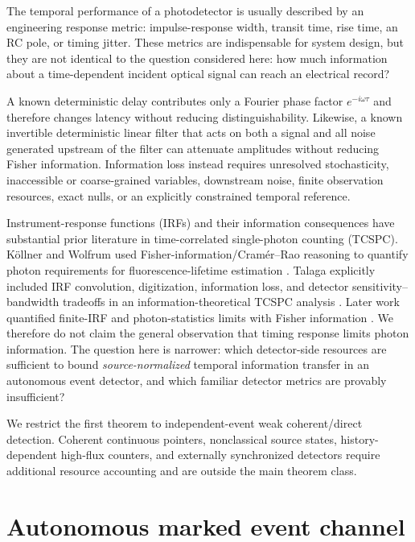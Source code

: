 \documentclass[aps,prapplied,preprint,nofootinbib]{revtex4-2}
\begin{document}
The temporal performance of a photodetector is usually described by an engineering response metric: impulse-response width, transit time, rise time, an RC pole, or timing jitter. These metrics are indispensable for system design, but they are not identical to the question considered here: how much information about a time-dependent incident optical signal can reach an electrical record?

A known deterministic delay contributes only a Fourier phase factor $e^{-i\omega\tau}$ and therefore changes latency without reducing distinguishability. Likewise, a known invertible deterministic linear filter that acts on both a signal and all noise generated upstream of the filter can attenuate amplitudes without reducing Fisher information. Information loss instead requires unresolved stochasticity, inaccessible or coarse-grained variables, downstream noise, finite observation resources, exact nulls, or an explicitly constrained temporal reference.

Instrument-response functions (IRFs) and their information consequences have substantial prior literature in time-correlated single-photon counting (TCSPC). K\"ollner and Wolfrum used Fisher-information/Cram\'er--Rao reasoning to quantify photon requirements for fluorescence-lifetime estimation \cite{KollnerWolfrum1992}. Talaga explicitly included IRF convolution, digitization, information loss, and detector sensitivity--bandwidth tradeoffs in an information-theoretical TCSPC analysis \cite{Talaga2009}. Later work quantified finite-IRF and photon-statistics limits with Fisher information \cite{Bouchet2019,TrinhEsposito2021}. We therefore do not claim the general observation that timing response limits photon information. The question here is narrower: which detector-side resources are sufficient to bound \emph{source-normalized} temporal information transfer in an autonomous event detector, and which familiar detector metrics are provably insufficient?

We restrict the first theorem to independent-event weak coherent/direct detection. Coherent continuous pointers, nonclassical source states, history-dependent high-flux counters, and externally synchronized detectors require additional resource accounting and are outside the main theorem class.

\section{Autonomous marked event channel}
\end{document}
